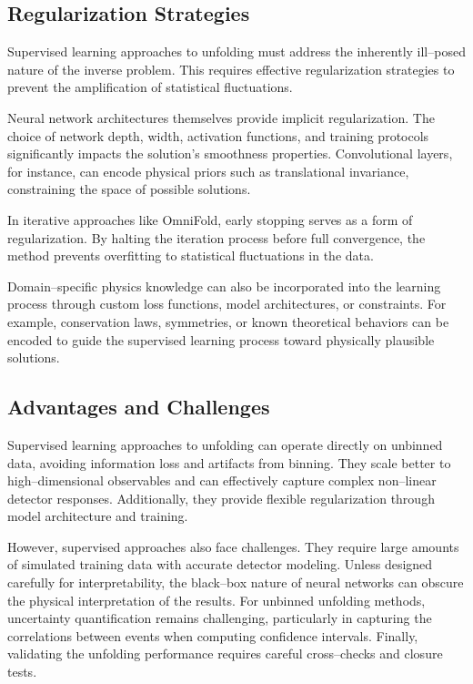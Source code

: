     \subsection{Regularization Strategies}
        Supervised learning approaches to unfolding must address the inherently ill--posed nature of the inverse problem.
        This requires effective regularization strategies to prevent the amplification of statistical fluctuations.

        Neural network architectures themselves provide implicit regularization.
        The choice of network depth, width, activation functions, and training protocols significantly impacts the solution's smoothness properties.
        Convolutional layers, for instance, can encode physical priors such as translational invariance, constraining the space of possible solutions.

        In iterative approaches like OmniFold, early stopping serves as a form of regularization.
        By halting the iteration process before full convergence, the method prevents overfitting to statistical fluctuations in the data.

        Domain--specific physics knowledge can also be incorporated into the learning process through custom loss functions, model architectures, or constraints.
        For example, conservation laws, symmetries, or known theoretical behaviors can be encoded to guide the supervised learning process toward physically plausible solutions.
    \subsection{Advantages and Challenges}
        Supervised learning approaches to unfolding can operate directly on unbinned data, avoiding information loss and artifacts from binning.
        They scale better to high--dimensional observables and can effectively capture complex non--linear detector responses.
        Additionally, they provide flexible regularization through model architecture and training.

        However, supervised approaches also face challenges.
        They require large amounts of simulated training data with accurate detector modeling.
        Unless designed carefully for interpretability, the black--box nature of neural networks can obscure the physical interpretation of the results.
        For unbinned unfolding methods, uncertainty quantification remains challenging, particularly in capturing the correlations between events when computing confidence intervals.
        Finally, validating the unfolding performance requires careful cross--checks and closure tests.

